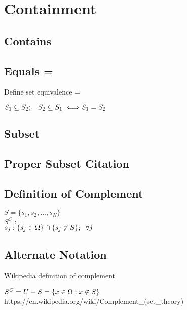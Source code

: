\documentclass[11pt]{article}
\begin{document}
\section{Containment}
\subsection{Contains}
\subsection{Equals = }
Define set equivalence  =
\begin{center}
$
S_1 \subseteq S_2 ; \hspace{3mm} S_2 \subseteq S_1 \hspace{1mm} \Longleftrightarrow S_1 = S_2 \hspace{3mm}
$
\end{center}


\subsection{Subset}



\subsection{Proper Subset Citation}




\subsection{Definition of Complement}
\begin{center}
$
S = \{ s_1,s_2,...,s_N \}
$
\\
$
S^C :=
$
\\
$
s_j: \{ s_j \in \Omega\} \cap \{s_j \not \in S\}; \hspace{2mm} \forall j
$
\end{center}
\subsection{Alternate Notation}
Wikipedia definition of complement
\begin{center}
$
S^C = U - S = \{x \in \Omega : x \not \in S\} \hspace{3mm} 
$
https://en.wikipedia.org/wiki/Complement\_(set\_theory)
\end{center}
\end{document}

